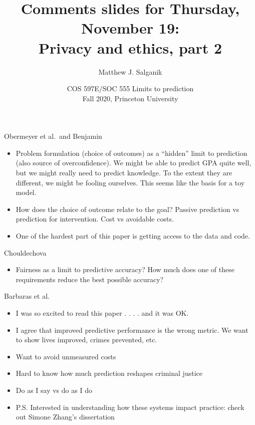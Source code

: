 \documentclass[aspectratio=169]{beamer}
\title[]{Comments slides for Thursday, November 19:\\Privacy and ethics, part 2}
\author[]{Matthew J. Salganik}
\institute[]{}
\date[]{COS 597E/SOC 555 Limits to prediction\\Fall 2020, Princeton University}
\begin{document}
\frame{\titlepage}
\begin{frame}

Obermeyer et al.\ and Benjamin
\begin{itemize}
\item Problem formulation (choice of outcomes) as a ``hidden'' limit to prediction (also source of overconfidence).  We might be able to predict GPA quite well, but we might really need to predict knowledge.  To the extent they are different, we might be fooling ourselves.  This seems like the basis for a toy model.
\pause
\item How does the choice of outcome relate to the goal?  Passive prediction vs prediction for intervention.  Cost vs avoidable costs.
\pause
\item One of the hardest part of this paper is getting access to the data and code.
\end{itemize}

\end{frame}
\begin{frame}

Chouldechova
\begin{itemize}
\item Fairness as a limit to predictive accuracy?  How much does one of these requirements reduce the best possible accuracy?
\end{itemize}

\end{frame}
\begin{frame}

Barbaras et al.
\begin{itemize}
\item I was so excited to read this paper . . . . \pause and it was OK.
\pause
\item I agree that improved predictive performance is the wrong metric. We want to show lives improved, crimes prevented, etc.
\pause
\item Want to avoid unmeasured costs
\pause
\item Hard to know how much prediction reshapes criminal justice
\pause
\item Do as I say vs do as I do
\pause
\item P.S. Interested in understanding how these systems impact practice: check out Simone Zhang's dissertation
\end{itemize}

\end{frame}

\frame{\titlepage}
\end{document}
